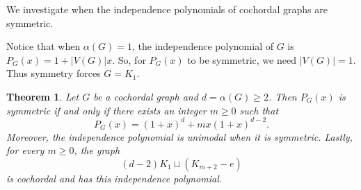 \documentclass[12pt]{amsart}
\theoremstyle{plain}
\newtheorem{thm}{Theorem}[section]
\theoremstyle{definition}
\begin{document}
We investigate when the independence polynomials of cochordal graphs are symmetric.


\begin{remark}
    Notice that when $\alpha(G)=1$, the independence polynomial of $G$ is $P_G(x)=1+|V(G)|x$. So, for $P_G(x)$ to be symmetric, we need $|V(G)|=1$. Thus symmetry forces  $G=K_1$.
\end{remark}


\begin{thm}
Let $G$ be a cochordal graph and \(d=\alpha(G)\ge 2\).
Then $P_G(x)$ is symmetric if and only if there exists an integer $m\ge 0$
such that
\[
P_G(x)=(1+x)^d+mx(1+x)^{d-2}.
\]
Moreover, the independence polynomial is unimodal when it is symmetric. Lastly, for every $m\ge 0$, the graph
\[
(d-2)K_1 \sqcup (K_{m+2}-e)
\]
is cochordal and has this independence polynomial.
\end{thm}
\end{document}
